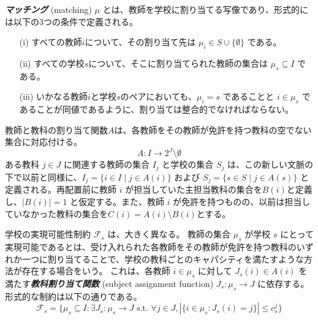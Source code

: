 \documentclass[12pt, a4paper]{article}
\theoremstyle{definition}
\theoremstyle{remark}
\theoremstyle{plain}
\begin{document}
\textbf{\textit{マッチング}} (matching) $\mu$ とは、教師を学校に割り当てる写像であり、形式的には以下の3つの条件で定義される。
\begin{itemize}
    \item[(i)] すべての教師$i$について、その割り当て先は $\mu_i \in S \cup \{\emptyset\}$ である。
    \item[(ii)] すべての学校$s$について、そこに割り当てられた教師の集合は $\mu_s \subseteq I$ である。
    \item[(iii)] いかなる教師$i$と学校$s$のペアにおいても、$\mu_i = s$ であることと $i \in \mu_s$ であることが同値であるように、割り当ては整合的でなければならない。
\end{itemize}




教師と教科の割り当て関数$A$は、各教師をその教師が免許を持つ教科の空でない集合に対応付ける。
\[
A: I \to 2^J\setminus {\emptyset}
\]
ある教科 $j \in J$ に関連する教師の集合 $I_j$ と学校の集合 $S_j$ は、この新しい文脈の下で以前と同様に、$I_j = \{i \in I \mid j \in A(i)\}$ および $S_j = \{s \in S \mid j \in A(s)\}$ と定義される。再配置前に教師 $i$ が担当していた主担当教科の集合を$B(i)$と定義し、$|B(i)| = 1$ と仮定する。また、教師 $i$ が免許を持つものの、以前は担当していなかった教科の集合を$C(i) = A(i) \setminus B(i)$とする。

学校の実現可能性制約 $\mathcal{F}_s$ は、大きく異なる。
教師の集合 $\mu_s$ が学校 $s$ にとって実現可能であるとは、受け入れられた各教師をその教師が免許を持つ教科のいずれか一つに割り当てることで、学校の教科ごとのキャパシティを満たすような方法が存在する場合をいう。
これは、各教師 $i \in \mu_s$ に対して $J_s(i) \in A(i)$ を満たす\textbf{\textit{教科割り当て関数}} (subject assignment function) $J_s : \mu_s \rightarrow J$ に依存する。
形式的な制約は以下の通りである。
\[
\mathcal{F}_s =\{\mu_s \subseteq I : \exists J_s:\mu_s \to J \text{ s.t. } \forall j \in J, |\{i \in \mu_s : J_s(i)= j\}| \leq c_s^j\}
\]
\end{document}
